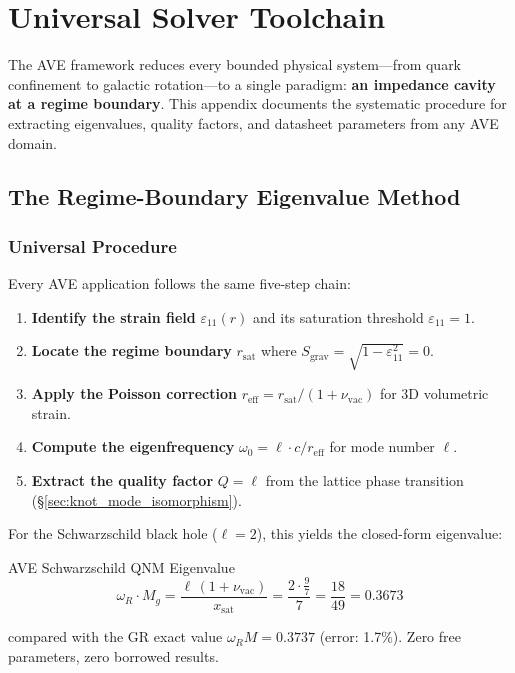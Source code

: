 \chapter{Universal Solver Toolchain}
\label{app:solver_toolchain}

The AVE framework reduces every bounded physical system---from quark confinement to galactic rotation---to a single paradigm: \textbf{an impedance cavity at a regime boundary}. This appendix documents the systematic procedure for extracting eigenvalues, quality factors, and datasheet parameters from any AVE domain.

\section{The Regime-Boundary Eigenvalue Method}
\label{sec:regime_eigenvalue}

\subsection{Universal Procedure}

Every AVE application follows the same five-step chain:

\begin{enumerate}
    \item \textbf{Identify the strain field} $\varepsilon_{11}(r)$ and its saturation threshold $\varepsilon_{11} = 1$.
    \item \textbf{Locate the regime boundary} $r_\mathrm{sat}$ where $S_\mathrm{grav} = \sqrt{1 - \varepsilon_{11}^2} = 0$.
    \item \textbf{Apply the Poisson correction} $r_\mathrm{eff} = r_\mathrm{sat} / (1 + \nu_\mathrm{vac})$ for 3D volumetric strain.
    \item \textbf{Compute the eigenfrequency} $\omega_0 = \ell \cdot c / r_\mathrm{eff}$ for mode number $\ell$.
    \item \textbf{Extract the quality factor} $Q = \ell$ from the lattice phase transition (\S\ref{sec:knot_mode_isomorphism}).
\end{enumerate}

\noindent For the Schwarzschild black hole ($\ell = 2$), this yields the closed-form eigenvalue:
\begin{resultbox}{AVE Schwarzschild QNM Eigenvalue}
\begin{equation}
    \boxed{\omega_R \cdot M_g = \frac{\ell \, (1 + \nu_\mathrm{vac})}{x_\mathrm{sat}}
    = \frac{2 \cdot \tfrac{9}{7}}{7} = \frac{18}{49} = 0.3673}
    \label{eq:ave_qnm_eigenvalue}
\end{equation}
\end{resultbox}
\noindent compared with the GR exact value $\omega_R M = 0.3737$ (error: 1.7\%).
Zero free parameters, zero borrowed results.

